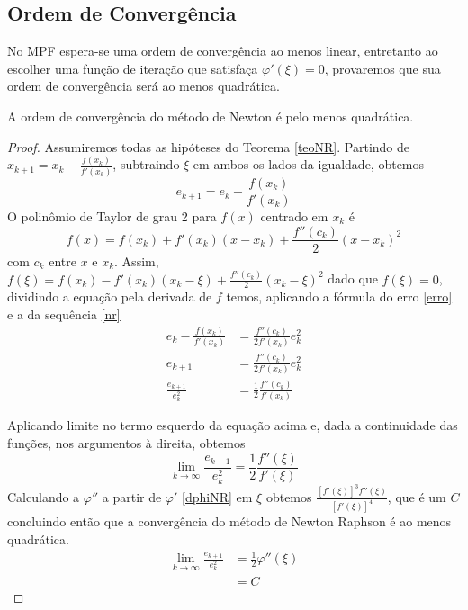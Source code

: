 \subsection{Ordem de Convergência}
No MPF espera-se uma ordem de convergência ao menos linear, entretanto ao escolher uma função de iteração que satisfaça $\varphi'(\xi) = 0$, provaremos que sua ordem de convergência será ao menos quadrática.
\begin{prop}
    A ordem de convergência do método de Newton é pelo menos quadrática.
\end{prop}
\begin{proof}
    Assumiremos todas as hipóteses do Teorema \ref{teoNR}. %
    Partindo de $x_{k+1} = x_k - \frac{f(x_k)}{f'(x_k)}$, subtraindo $\xi$ em ambos os lados da igualdade, obtemos
\begin{equation} \label{eMNR}
    e_{k+1} = e_k - \frac{f(x_k)}{f'(x_k)} 
\end{equation}
O polinômio de Taylor de grau 2 para $f(x)$ centrado em $x_k$ é
\begin{equation*}
    f(x) = f(x_k) + f'(x_k)(x - x_k) + \frac{f''(c_k)}{2}(x-x_k)^2
\end{equation*}
com $c_k$ entre $x$ e $x_k$.
Assim, $f(\xi) = f(x_k) - f'(x_k)(x_k - \xi) + \frac{f''(c_k)}{2}(x_k-\xi)^2$ dado que $f(\xi) = 0$, dividindo a equação pela derivada de $f$ temos, aplicando a fórmula do erro \ref{erro} e a da sequência \ref{nr}
\begin{align*}
    e_k - \frac{f(x_k)}{f'(x_k)} &= \frac{f''(c_k)}{2f'(x_k)}e_k^2 \\
    e_{k+1} &= \frac{f''(c_k)}{2f'(x_k)}e_k^2 \\
    \frac{e_{k+1}}{e_k^2} &= \frac{1}{2} \frac{f''(c_k)}{f'(x_k)}
\end{align*}

Aplicando limite no termo esquerdo da equação acima e, dada a continuidade das funções, nos argumentos à direita, obtemos 
\begin{equation*}
    \lim_{k \to \infty} \frac{e_{k+1}}{e_k^2} = \frac{1}{2} \frac{f''(\xi)}{f'(\xi)}
\end{equation*}
Calculando a $\varphi''$ a partir de $\varphi'$ \ref{dphiNR} %
em $\xi$ obtemos $\frac{[f'(\xi)]^3f''(\xi)}{[f'(\xi)]^4}$, que é um $C$ concluindo então que a convergência do método de Newton Raphson é ao menos quadrática.
\begin{align*}
    \lim_{k \to \infty} \frac{e_{k+1}}{e_k^2} &= \frac{1}{2} \varphi''(\xi) \\
    &= C
\end{align*}
\end{proof}
